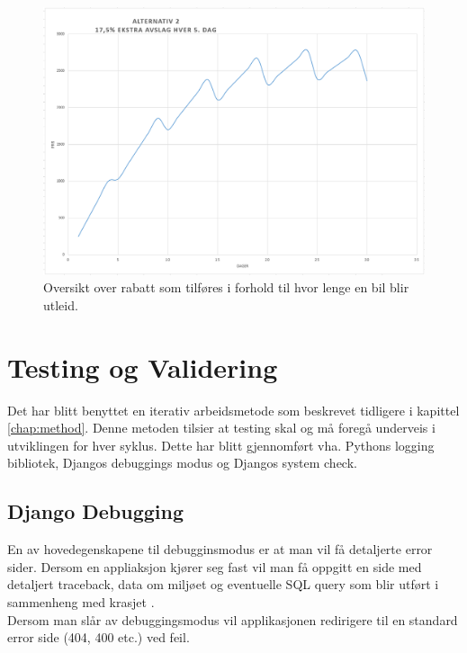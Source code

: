  \begin{figure}[htbp]
	\centering
		\includegraphics[scale=0.5]{Bilder/avslag2.png}
	\caption[Utleiepris Diagram]{Oversikt over rabatt som tilføres i forhold til hvor lenge en bil blir utleid. } %
	\label{fig:price_reduction}
\end{figure}




\clearpage


\clearpage
\section{Testing og Validering}
Det har blitt benyttet en iterativ arbeidsmetode som beskrevet tidligere i kapittel \ref{chap:method}. Denne metoden tilsier at testing skal og må foregå underveis i utviklingen for hver syklus. Dette har blitt gjennomført vha. Pythons logging bibliotek, Djangos debuggings modus og Djangos system check. 

\subsection{Django Debugging}
En av hovedegenskapene til debugginsmodus er at man vil få detaljerte error sider.  Dersom en appliaksjon kjører seg fast vil man få oppgitt en side med detaljert traceback, data om miljøet og eventuelle SQL query som blir utført i sammenheng med krasjet \cite{django:debug}. \\
Dersom man slår av debuggingsmodus vil applikasjonen redirigere til en standard error side (404, 400 etc.) ved feil.


